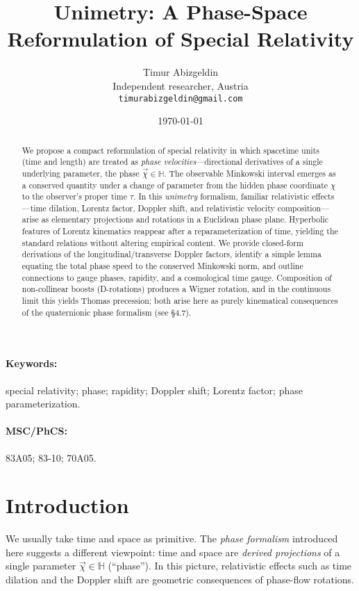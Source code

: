 \documentclass[11pt]{article}
\title{Unimetry: A Phase-Space Reformulation of Special Relativity}
\author{Timur Abizgeldin\\ \small Independent researcher, Austria\\ \small \texttt{timurabizgeldin@gmail.com}}
\date{\today}
\numberwithin{equation}{section}
\begin{document}
\maketitle

\begin{abstract}We propose a compact reformulation of special relativity in which spacetime units (time and length) are treated as \emph{phase velocities}---directional derivatives of a single underlying parameter, the phase $\vec{\chi}\in\mathbb{H}$. The observable Minkowski interval emerges as a conserved quantity under a change of parameter from the hidden phase coordinate $\chi$ to the observer's proper time $\tau$. In this \emph{unimetry} formalism, familiar relativistic effects---time dilation, Lorentz factor, Doppler shift, and relativistic velocity composition---arise as elementary projections and rotations in a Euclidean phase plane. Hyperbolic features of Lorentz kinematics reappear after a reparameterization of time, yielding the standard relations without altering empirical content. We provide closed-form derivations of the longitudinal/transverse Doppler factors, identify a simple lemma equating the total phase speed to the conserved Minkowski norm, and outline connections to gauge phases, rapidity, and a cosmological time gauge. Composition of non-collinear boosts (D-rotations) produces a Wigner rotation, and in the continuous limit this yields Thomas precession; both arise here as purely kinematical consequences of the quaternionic phase formalism (see §4.7).\end{abstract}

\paragraph{Keywords:} special relativity; phase; rapidity; Doppler shift; Lorentz factor; phase parameterization.

\paragraph{MSC/PhCS:} 83A05; 83-10; 70A05.

\section{Introduction}
We usually take time and space as primitive. The \emph{phase formalism} introduced here suggests a different viewpoint: time and space are \emph{derived projections} of a single parameter $\vec{\chi}\in\mathbb{H}$ (``phase''). In this picture, relativistic effects such as time dilation and the Doppler shift are geometric consequences of phase-flow rotations.
\end{document}

